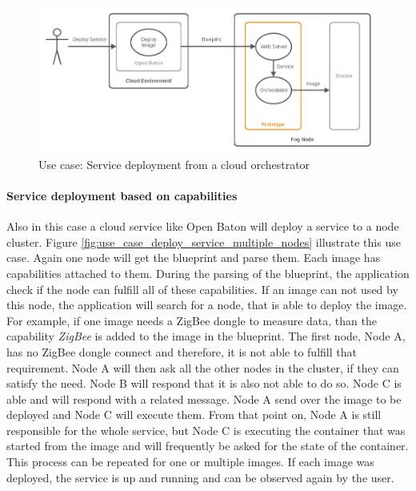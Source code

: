 \begin{figure}[H]
    \centering
    \includegraphics[width=\textwidth]{resources/images/use_case_deploy_service.png}
    \caption[Use case: Service deployment from a cloud orchestrator]{Use case: Service deployment from a cloud orchestrator}
    \label{fig:use_case_deploy_service}
\end{figure}

\paragraph{Service deployment based on capabilities}
Also in this case a cloud service like Open Baton will deploy a service to a node cluster.
Figure \ref{fig:use_case_deploy_service_multiple_nodes} illustrate this use case.
Again one node will get the blueprint and parse them.
Each image has capabilities attached to them.
During the parsing of the blueprint, the application check if the node can fulfill all of these capabilities.
If an image can not used by this node, the application will search for a node, that is able to deploy the image.
For example, if one image needs a ZigBee dongle to measure data, than the capability \textit{ZigBee} is added to the image in the blueprint.
The first node, Node A, has no ZigBee dongle connect and therefore, it is not able to fulfill that requirement.
Node A will then ask all the other nodes in the cluster, if they can satisfy the need.
Node B will respond that it is also not able to do so.
Node C is able and will respond with a related message.
Node A send over the image to be deployed and Node C will execute them.
From that point on, Node A is still responsible for the whole service, but Node C is executing the container that was started from the image and will frequently be asked for the state of the container.
This process can be repeated for one or multiple images.
If each image was deployed, the service is up and running and can be observed again by the user.

